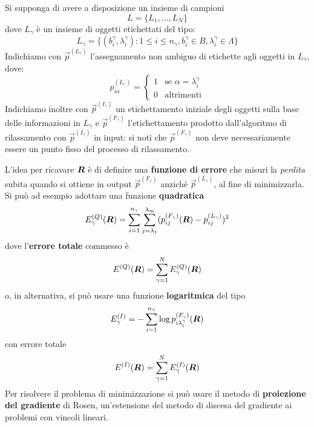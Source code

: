 Si supponga di avere a disposizione un insieme di campioni
\begin{displaymath}
	L = \{L_1, \dots, L_N\}
\end{displaymath}
dove $L_\gamma$ è un insieme di oggetti etichettati del tipo:
\begin{displaymath}
	L_\gamma = \{(b_i^\gamma, \lambda_i^\gamma) : 1 \leq i \leq n_\gamma, b_i^\gamma \in B, \lambda_i^\gamma \in \Lambda\}
\end{displaymath}
Indichiamo con $\vec{p}^{(L_\gamma)}$ l'assegnamento non ambiguo di etichette agli oggetti in $L_\gamma$, dove:
\begin{displaymath}
	p_{i \alpha}^{(L_\gamma)} = \begin{cases}
 		1 & \text{se } \alpha = \lambda_i^\gamma \\
 		0 & \text{altrimenti}
 	\end{cases}
\end{displaymath}
Indichiamo inoltre con $\vec{p}^{(I_\gamma)}$ un etichettamento iniziale degli oggetti sulla base delle informazioni in $L_\gamma$ e $\vec{p}^{(F_\gamma)}$ l'etichettamento prodotto dall'algoritmo di rilassamento con $\vec{p}^{(I_\gamma)}$ in input: si noti che $\vec{p}^{(F_\gamma)}$ non deve necessariamente essere un punto fisso del processo di rilassamento.

L'idea per ricavare $\mat{R}$ è di definire una \textbf{funzione di errore} che misuri la \emph{perdita} subita quando si ottiene in output $\vec{p}^{(F_\gamma)}$ anziché $\vec{p}^{(L_\gamma)}$, al fine di minimizzarla. Si può ad esempio adottare una funzione \textbf{quadratica}
\begin{displaymath}
	E_\gamma^{(Q)}(\mat{R}) = \sum_{i = 1}^{n_\gamma} \sum_{j = \lambda_1}^{\lambda_m} (p_{ij}^{(F_\gamma)}(\mat{R}) - p_{ij}^{(L_\gamma)})^2
\end{displaymath}
dove l'\textbf{errore totale} commesso è
\begin{displaymath}
	E^{(Q)}(\mat{R}) = \sum_{\gamma = 1}^N E_\gamma^{(Q)}(\mat{R})
\end{displaymath}
o, in alternativa, si può usare una funzione \textbf{logaritmica} del tipo
\begin{displaymath}
	E_\gamma^{(I)} = - \sum_{i = 1}^{n_\gamma} \log p_{i \lambda_i^\gamma}^{(F_\gamma)}(\mat{R})
\end{displaymath}
con errore totale
\begin{displaymath}
	E^{(I)}(\mat{R}) = \sum_{\gamma = 1}^N E_\gamma^{(I)}(\mat{R})
\end{displaymath}
Per risolvere il problema di minimizzazione si può usare il metodo di \textbf{proiezione del gradiente} di Rosen, un'estensione del metodo di discesa del gradiente ai problemi con vincoli lineari.

